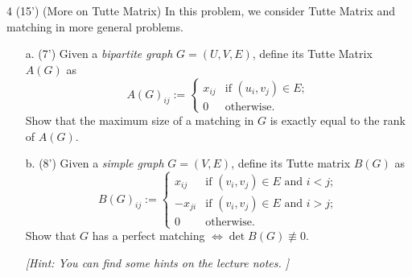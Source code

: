 \begin{question}{4 (15') (More on Tutte Matrix)} 
In this problem, we consider Tutte Matrix and matching in more general problems.
\begin{itemize}
	\item[a. (7')] Given a \textit{bipartite graph} $G = (U, V, E)$, define its Tutte Matrix $A(G)$ as 
\begin{equation*}
	A(G)_{ij}:=\begin{cases}
	x_{ij} & \text{if }(u_i,v_j)\in E;\\
	0 & \text{otherwise.}
	\end{cases}
\end{equation*}
Show that the maximum size of a matching in $G$ is exactly equal to the rank of $A(G)$.
	\item[b. (8')] Given a \textit{simple graph} $G=(V,E)$, define its Tutte matrix $B(G)$ as
\begin{equation*}
	B(G)_{ij}:=\begin{cases}
	x_{ij} & \text{if }(v_i,v_j)\in E\text{ and }i<j;\\
	-x_{ji} & \text{if }(v_i,v_j)\in E\text{ and }i>j;\\
	0 & \text{otherwise.}
	\end{cases}
\end{equation*}
Show that $G$ has a perfect matching $\Leftrightarrow\det B(G)\not\equiv 0$. 

\textit{[Hint: You can find some hints on the lecture notes. ]}

\end{itemize}
\end{question}  

